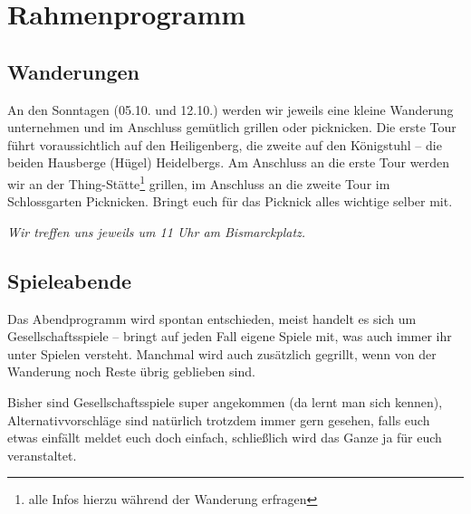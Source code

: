 \section{Rahmenprogramm}
\subsection{Wanderungen}
An den Sonntagen (05.10. und 12.10.) werden wir jeweils eine kleine Wanderung
unternehmen und im Anschluss gemütlich grillen oder picknicken. Die erste Tour
führt voraussichtlich auf den Heiligenberg, die zweite auf den Königstuhl --
die beiden Hausberge (Hügel) Heidelbergs. Am Anschluss an die erste Tour werden
wir an der Thing-Stätte\footnote{alle Infos hierzu während der Wanderung
erfragen} grillen, im Anschluss an die zweite Tour im Schlossgarten Picknicken.
Bringt euch für das Picknick alles wichtige selber mit.

\noindent\emph{Wir treffen uns jeweils um 11 Uhr am Bismarckplatz.}

\subsection{Spieleabende}
Das Abendprogramm wird spontan entschieden, meist handelt es sich um Gesellschaftsspiele -- bringt auf jeden Fall eigene Spiele mit, was auch immer ihr unter Spielen versteht. Manchmal wird auch zusätzlich gegrillt, wenn von der Wanderung noch Reste übrig geblieben sind.

Bisher sind Gesellschaftsspiele super angekommen (da lernt man sich kennen), Alternativvorschläge sind natürlich trotzdem immer gern gesehen, falls euch etwas einfällt meldet euch doch einfach, schließlich wird das Ganze ja für euch veranstaltet.


\iffalse
